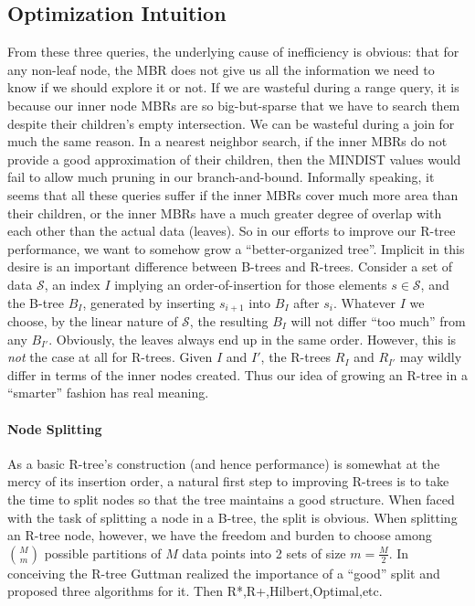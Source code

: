 \subsection{Optimization Intuition}
From these three queries, the underlying cause of inefficiency is obvious: that for any non-leaf node, the MBR does not give us all the information we need to know if we should explore it or not.
If we are wasteful during a range query, it is because our inner node MBRs are so big-but-sparse that we have to search them despite their children's empty intersection.
We can be wasteful during a join for much the same reason.
In a nearest neighbor search, if the inner MBRs do not provide a good approximation of their children, then the MINDIST values would fail to allow much pruning in our branch-and-bound.
Informally speaking, it seems that all these queries suffer if the inner MBRs cover much more area than their children, or the inner MBRs have a much greater degree of overlap with each other than the actual data (leaves).
So in our efforts to improve our R-tree performance, we want to somehow grow a ``better-organized tree''.
Implicit in this desire is an important difference between B-trees and R-trees.
Consider a set of data $\mathcal S$, an index $I$ implying an order-of-insertion for those elements $s\in \mathcal S$, and the B-tree $B_I$, generated by inserting $s_{i+1}$ into $B_I$ after $s_{i}$.
Whatever $I$ we choose, by the linear nature of $\mathcal S$, the resulting $B_I$ will not differ ``too much'' from any $B_{I\prime}$.
Obviously, the leaves always end up in the same order.
However, this is \emph{not} the case at all for R-trees.
Given $I$ and $I\prime$, the R-trees $R_I$ and $R_{I\prime}$ may wildly differ in terms of the inner nodes created.
Thus our idea of growing an R-tree in a ``smarter'' fashion has real meaning.

\paragraph{Node Splitting}
As a basic R-tree's construction (and hence performance) is somewhat at the mercy of its insertion order, a natural first step to improving R-trees is to take the time to split nodes so that the tree maintains a good structure.
When faced with the task of splitting a node in a B-tree, the split is obvious.
When splitting an R-tree node, however, we have the freedom and burden to choose among $\binom{M}{m}$ possible partitions of $M$ data points into 2 sets of size $m=\frac{M}{2}$.
In conceiving the R-tree Guttman realized the importance of a ``good'' split and proposed three algorithms for it.
Then R*,R+,Hilbert,Optimal,etc.

